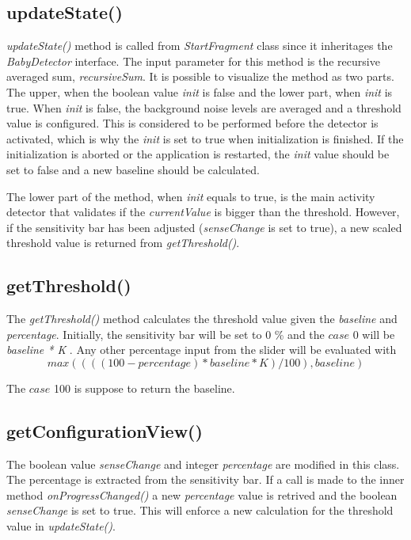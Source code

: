 \subsection{updateState()}
\emph{updateState()} method is called from \emph{StartFragment} class since it
inheritages the \emph{BabyDetector} interface. The input parameter for this
method is the recursive averaged sum, \emph{recursiveSum}. It is possible to
visualize the method as two parts. The upper, when the boolean value \emph{init}
is false and the lower part, when \emph{init} is true. When \emph{init} is
false, the background noise levels are averaged and a threshold value is
configured. This is considered to be performed before the detector is activated,
which is why the \emph{init} is set to true when initialization is finished. If
the initialization is aborted or the application is restarted, the \emph{init}
value should be set to false and a new baseline should be calculated.

The lower part of the method, when \emph{init} equals to true, is the main 
activity detector that validates if the \emph{currentValue} is bigger than the 
threshold. However, if the sensitivity bar has been adjusted (\emph{senseChange}
is set to true), a new scaled threshold value is returned from 
\emph{getThreshold()}.

\subsection{getThreshold()}
The \emph{getThreshold()} method calculates the threshold value given the
\emph{baseline} and \emph{percentage}. Initially, the sensitivity bar will be 
set to 0 \% and the $case$ 0 will be \emph{baseline * K} . Any other percentage input
from the slider will be evaluated with
\[
max((((100-percentage)*baseline*K)/100),baseline)
\]

The $case$ 100 is suppose to return the baseline.


\subsection{getConfigurationView()}
The boolean value \emph{senseChange} and integer \emph{percentage} are modified
in this class. The percentage is extracted from the sensitivity bar. If a call
is made to the inner method \emph{onProgressChanged()} a new \emph{percentage} 
value is retrived and the boolean \emph{senseChange} is set to true. This will
enforce a new calculation for the threshold value in \emph{updateState()}.



